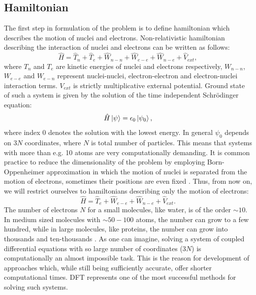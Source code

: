 \documentclass[openany, longbibliography,slovene,a4paper,12pt]{article}
\begin{document}
\subsection{Hamiltonian}
The first step in formulation of the problem is to define hamiltonian which
describes the motion of nuclei and electrons. Non-relativistic hamiltonian
describing the interaction of  nuclei and electrons can be written as follows:
\begin{equation} \label{full_hamiltonian}
\hat H= \hat T_n + \hat  T_e + \hat  W_{n-n} + \hat W_{e-e} + \hat W_{n-e} + \hat V_{ext},
\end{equation}
where $T_n$ and $T_e$ are kinetic energies of nuclei and electrons respectively,
$W_{n-n}$, $W_{e-e}$ and $W_{e-n}$ represent nuclei-nuclei, electron-electron
and electron-nuclei interaction terms. $V_{ext}$ is strictly multiplicative
external potential. Ground state of such a system is given by the solution of
the time independent Schr{\"o}dinger equation:
\begin{equation} \label{ham_solution}
\hat H \ket { \psi } = \epsilon_0 \ket{ \psi_0 },
\end{equation} 
where index $0$ denotes the solution with the lowest energy. In general $\psi_0$
depends on $3N$ coordinates, where $N$ is total number of particles. This means
that systems with more than e.g. 10 atoms are very computationally
demanding. It is common practice to reduce the dimensionality of the problem by employing
Born-Oppenheimer approximation in which the motion of nuclei is separated from
the motion of electrons, sometimes their positions are even fixed
\cite{advanced_course, nobel_lecture}. Thus, from now on, we will
restrict ourselves to hamiltonians describing only the motion of electrons:
\begin{equation} \label{electron_hamiltonian}
\hat H=  \hat  T_e  + \hat W_{e-e} + \hat W_{n-e} + \hat V_{ext}.
\end{equation}
The number of electrons $N$ for a small molecules, like water, is of the order
$\sim 10$. In medium sized molecules with $\sim 50-100$ atoms, the number can
grow to a few hundred, while in large molecules, like proteins, the number can
grow into thousands and ten-thousands \cite{ab_initio_nmr_spect_molec}. As one can imagine, solving a system of
coupled differential equations with so large number of coordinates ($3N$) is
computationally an almost impossible task.
This is the reason for development of approaches which, while still being
sufficiently accurate, offer shorter computational times. DFT represents one of
the most successful methods for solving such systems.
\end{document}
